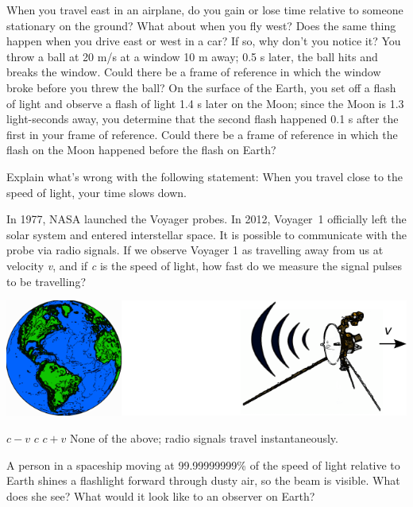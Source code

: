 \documentclass[12pt]{exam}
\begin{document}
\begin{questions}
\question When you travel east in an airplane, do you gain or lose time relative to someone stationary on the ground? What about when you fly west? Does the same thing happen when you drive east or west in a car? If so, why don't you notice it?
\vspace{0.75in}
\question You throw a ball at 20 m/s at a window 10 m away; 0.5 s later, the ball hits and breaks the window. Could there be a frame of reference in which the window broke before you threw the ball?
\vspace{0.75in}
\question On the surface of the Earth, you set off a flash of light and observe a flash of light 1.4 s later on the Moon; since the Moon is 1.3 light-seconds away, you determine that the second flash happened 0.1 s after the first in your frame of reference. Could there be a frame of reference in which the flash on the Moon happened before the flash on Earth?
\vspace{0.75in}

\question Explain what's wrong with the following statement: When you travel close to the speed of light, your time slows down.
\vspace{0.75in}

\question In 1977, NASA launched the Voyager probes. In 2012, Voyager~1 officially left the solar system and entered interstellar space. It is possible to communicate with the probe via radio signals. If we observe Voyager 1 as travelling away from us at velocity \textit{v}, and if \textit{c} is the speed of light, how fast do we measure the signal pulses to be travelling?
	
	\noindent\begin{center}\includegraphics{../images/spacesignal.pdf}\end{center}
	
	\begin{choices}
		\choice $c - v$
		\choice $c$
		\choice $c + v$
		\choice None of the above; radio signals travel instantaneously.
	\end{choices}
	
\clearpage
\question A person in a spaceship moving at 99.99999999\% of the speed
of light relative to Earth shines a flashlight forward through dusty air, so
the beam is visible. What does she see? What would it look like to an
observer on Earth?


\end{questions}
\end{document}
